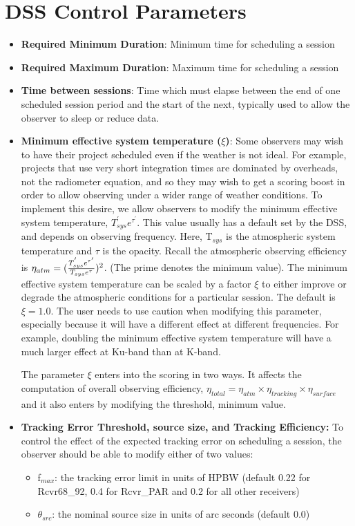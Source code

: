 \chapter{DSS Control Parameters}\label{appendix:dsscontrolparameters}


\begin{itemize}
\item {\bf Required Minimum Duration}: Minimum time for scheduling a session
\item {\bf Required Maximum Duration}: Maximum time for scheduling a session
\item {\bf Time between sessions}: Time which must elapse between the end of one scheduled session period 
and the start of the next, typically used to allow the observer to sleep or reduce data.
\item {\bf  Minimum effective system temperature ($\xi$)}: 
Some observers may wish to have their project scheduled even
if the weather is not ideal.  For example, projects that use very short integration times are dominated by
overheads, not the radiometer equation, and so they may wish to get a scoring boost in order to allow observing
under a wider range of weather conditions.  To implement this desire, we allow observers to modify the
minimum effective system temperature, $T_{sys}^{'}e^{\tau^{'}}$.  This value usually has a default
set by the DSS, and depends on observing frequency.  Here, T$_{sys}$ is the atmospheric system temperature 
and $\tau$ is the opacity. Recall the atmospheric observing efficiency is
$\eta_{atm} = ({{T_{sys}^{'}e^{\tau'}}\over{T_{sys}e^{\tau}}})^2$. 
(The prime denotes the minimum value).  The minimum effective system temperature can be scaled by a factor $\xi$ to either 
improve or degrade the atmospheric conditions for a particular session. The default is $\xi = 1.0$. The user needs to use caution
when modifying this parameter, especially because it will have a different effect at different frequencies.
For example, doubling the minimum effective system temperature will have a much larger effect at Ku-band than at K-band.

The parameter $\xi$ enters into the scoring in two ways.  It affects the computation of overall observing efficiency,
$\eta_{total} = \eta_{atm} \times \eta_{tracking} \times \eta_{surface}$ and it also enters by modifying the threshold, minimum value.
\item {\bf Tracking Error Threshold, source size, and Tracking Efficiency:}
To control the effect of the expected tracking error on scheduling a session, the observer should be able to 
modify either of two values:
\begin{itemize}
\item{f$_{max}$: the tracking error limit in units of HPBW
(default 0.22 for Rcvr68\_92, 0.4 for Rcvr\_PAR and 0.2 for all other receivers)}
\item{$\theta_{src}$: the nominal source size in units of arc seconds (default 0.0)}
\end{itemize}


\end{itemize}
